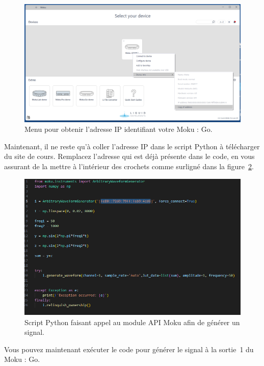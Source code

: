\documentclass[canadien,12pt,oneside,letterpaper]{article}
\begin{document}
\begin{figure}[h]
\centering
    \includegraphics[scale=0.35]{L07_MokuTuto3.png}
    \caption{Menu pour obtenir l'adresse IP identifiant votre Moku : Go.}
    \label{fig:MokuIP}
\end{figure}

Maintenant, il ne reste qu'à coller l'adresse IP dans le script Python à télécharger du site de cours. Remplacez l'adresse qui est déjà présente dans le code, en vous assurant de la mettre à l'intérieur des crochets comme surligné dans la figure~\ref{fig:MokuScript}.

\begin{figure}[h]
\centering
    \includegraphics[scale=0.6]{L07_MokuTuto4.png}
    \caption{Script Python faisant appel au module API Moku afin de générer un signal.}
    \label{fig:MokuScript}
\end{figure}

Vous pouvez maintenant exécuter le code pour générer le signal à la sortie~1 du Moku : Go.
\end{document}
